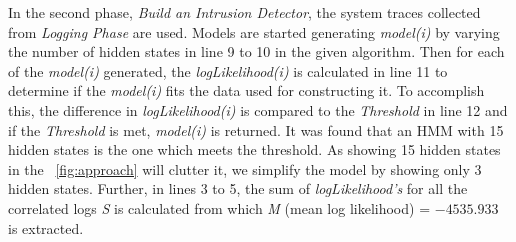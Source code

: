 \begin{table}
\centering
\caption{Slice of a faulty system trace obtained while an UAV was flying on a random route and infected by distance spoofing attack}
\label{tab:faultyCorrelationLog}
\end{table}
In the second phase, \textit{Build an Intrusion Detector}, the system traces collected from \textit{Logging Phase} are used. Models are started generating \textit{model(i)} by varying the number of hidden states in line 9 to 10 in the given algorithm. Then for each of the \textit{model(i)} generated, the \textit{logLikelihood(i)} is calculated in line 11 to determine if the \textit{model(i)} fits the data used for constructing it. To accomplish this, the difference in \textit{logLikelihood(i)} is compared to the \textit{Threshold} in line 12 and if the \textit{Threshold} is met, \textit{model(i)} is returned. It was found that an \ac{HMM} with 15 hidden states is the one which meets the threshold. As showing 15 hidden states in the ~\autoref{fig:approach} will clutter it, we simplify the model by showing only 3 hidden states. Further, in lines 3 to 5, the sum of \textit{logLikelihood's} for all the correlated logs \textit{S} is calculated from which \textit{M} (mean log likelihood) = $-4535.933$ is extracted.

